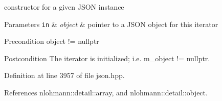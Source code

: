 constructor for a given J\+S\+ON instance 


\begin{DoxyParams}[1]{Parameters}
\mbox{\tt in}  & {\em object} & pointer to a J\+S\+ON object for this iterator \\
\hline
\end{DoxyParams}
\begin{DoxyPrecond}{Precondition}
object != nullptr 
\end{DoxyPrecond}
\begin{DoxyPostcond}{Postcondition}
The iterator is initialized; i.\+e. {\ttfamily m\+\_\+object != nullptr}. 
\end{DoxyPostcond}


Definition at line 3957 of file json.\+hpp.



References nlohmann\+::detail\+::array, and nlohmann\+::detail\+::object.


